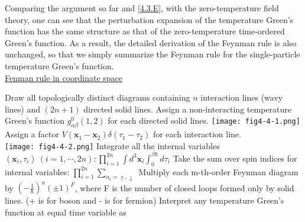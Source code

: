 Comparing the argument so far and \ref{4.3.E}, with the zero-temperature field theory, one can see that the perturbation expansion of the temperature Green's function has the same structure as that of the zero-temperature time-ordered Green's function.
As a result, the detailed derivation of the Feynman rule is also unchanged, so that we simply summarize the Feynman rule for the single-particle temperature Green's function.\\
\uline{Fenman rule in coordinate space}

Draw all topologically distinct diagrams containing $n$ interaction lines (wavy lines) and $(2n+1)$ directed solid lines.
Assign a non-interacting temperature Green's function $g_{\alpha\beta}^0(1,2)$ for each directed solid lines. \texttt{[image: fig4-4-1.png]}
Assign a factor $V(\mathbf{x}_1-\mathbf{x}_2)\delta(\tau_1-\tau_2)$ for each interaction line.\\
\texttt{[image: fig4-4-2.png]}
Integrate all the internal variables $(\mathbf{x}_i,\tau_i)\ (i=1,\cdots,2n): \prod\limits_{i=1}^{2n} \int d^3 \mathbf{x}_i \int_0^{\beta\hbar} d\tau_i$
Take the sum over spin indices for internal variables: $\prod\limits_{i=1}^{2n} \sum\limits_{\alpha_i=\uparrow,\downarrow}$
Multiply each m-th-order Feynman diagram by $\left(-\frac{1}{\hbar}\right)^n (\pm1)^F$, where F is the number of closed loops formed only by solid lines. (+ is for boson and - is for fermion)
Interpret any temperature Green's function at equal time variable as

